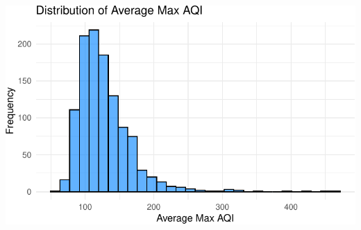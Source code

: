 \documentclass[
  12pt,
]{article}
\begin{document}
\includegraphics{final_main_quarto_presentation_files/figure-pdf/unnamed-chunk-7-1.pdf}
\end{document}
